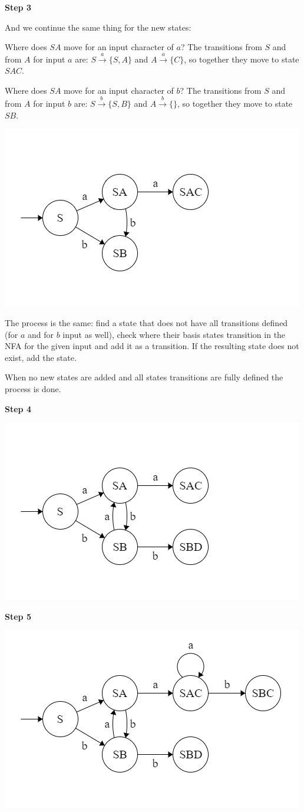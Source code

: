 \textbf{Step 3}

And we continue the same thing for the new states:

Where does $SA$ move for an input character of $a$? The transitions from $S$ and from $A$ for input $a$ are: $S\xrightarrow{a}\{S,A\}$ and $A\xrightarrow{a}\{C\}$, so together they move to state $SAC$.

Where does $SA$ move for an input character of $b$? The transitions from $S$ and from $A$ for input $b$ are: $S\xrightarrow{b}\{S,B\}$ and $A\xrightarrow{b}\{\}$, so together they move to state $SB$.

\includegraphics[width=0.7\linewidth]{02/dfa_step_03.png}

The process is the same: find a state that does not have all transitions defined (for $a$ and for $b$ input as well), check where their basis states transition in the NFA for the given input and add it as a transition. If the resulting state does not exist, add the state.

When no new states are added and all states transitions are fully defined the process is done.

\textbf{Step 4}

\includegraphics[width=0.7\linewidth]{02/dfa_step_04.png}

\textbf{Step 5}

\includegraphics[width=0.7\linewidth]{02/dfa_step_05.png}


